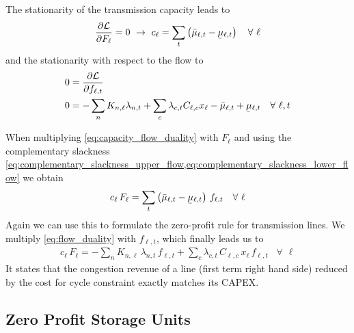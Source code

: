 \documentclass[11pt,twocolumn]{article}
\newcommand{\ubar}[1]{\underaccent{\bar}{#1}}
\newcommand{\Forall}[1]{\hspace{10pt} \forall \,\, #1 }
\newcommand{\pdv}[2]{\frac{\partial #1}{\partial #2}}
\newcommand{\flow}{f_{\ell,t}}
\newcommand{\capacityflow}{F_{\ell}}
\newcommand{\capitalpriceflow}{c_{\ell}}
\newcommand{\mulowerflow}{\ubar{\mu}_{\ell,t}}
\newcommand{\muupperflow}{\bar{\mu}_{\ell,t}}
\newcommand{\lagrangian}{\mathcal{L}}
\newcommand{\lmp}[1][n]{\lambda_{#1,t}}
\newcommand{\incidence}[1][n]{K_{#1,\ell}}
\newcommand{\cycle}{C_{\ell,c}}
\newcommand{\reactance}{x_\ell}
\newcommand{\cycleprice}{\lambda_{c,t}}
\begin{document}
The stationarity of the transmission capacity leads to
\begin{align}
\pdv{\lagrangian}{\capacityflow} = 0 \,\, \rightarrow \,\, 
\capitalpriceflow =  \sum_t \left( \muupperflow - \mulowerflow \right) \Forall{\ell}
\label{eq:capacity_flow_duality}
\end{align}
and the stationarity with respect to the flow to
\begin{align}
    0 &= \pdv{\lagrangian}{\flow}  \\ 
    0 &= - \sum_n \incidence \lmp  + \sum_c \cycleprice \cycle \reactance  - \muupperflow + \mulowerflow \Forall{\ell, t} \label{eq:flow_duality}
\end{align}
    
    
When multiplying \cref{eq:capacity_flow_duality} with $\capacityflow$ and using the complementary slackness \cref{eq:complementary_slackness_upper_flow,eq:complementary_slackness_lower_flow} we obtain 
\begin{align}
 \capitalpriceflow \, \capacityflow = \sum_t \left( \muupperflow - \mulowerflow \right)  \, \flow \Forall{\ell} 
 \label{eq:capital_price_flow_sum}
\end{align}
Again we can use this to formulate the zero-profit rule for transmission lines. We multiply \cref{eq:flow_duality} with $\flow$, which finally leads us to 
\begin{align}
\capitalpriceflow \, \capacityflow = - \sum_n \incidence\, \lmp\, \flow + \sum_c \cycleprice\, \cycle\, \reactance\, \flow 
\Forall{\ell} \end{align}
It states that the congestion revenue of a line (first term right hand side) reduced by the cost for cycle constraint exactly matches its CAPEX. 


\subsection{Zero Profit Storage Units}
\label{sec:zero_profit_storage_units}
\end{document}
